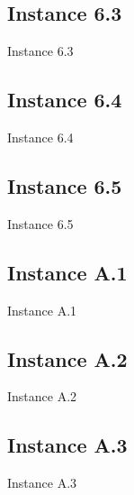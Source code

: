\subsection{Instance 6.3}
\begin{table}[H]
\centering

\caption{Instance 6.3}
\label{tblscp63}
\end{table}
\newpage

\subsection{Instance 6.4}
\begin{table}[H]
\centering

\caption{Instance 6.4}
\label{tblscp64}
\end{table}
\newpage

\subsection{Instance 6.5}
\begin{table}[H]
\centering

\caption{Instance 6.5}
\label{tblscp65}
\end{table}
\newpage

\subsection{Instance A.1}
\begin{table}[H]
\centering

\caption{Instance A.1}
\label{tblscpA1}
\end{table}

\newpage

\subsection{Instance A.2}
\begin{table}[H]
\centering

\caption{Instance A.2}
\label{tblscpA2}
\end{table}

\newpage
\subsection{Instance A.3}
\begin{table}[H]
\centering

\caption{Instance A.3}
\label{tblscpA3}
\end{table}

